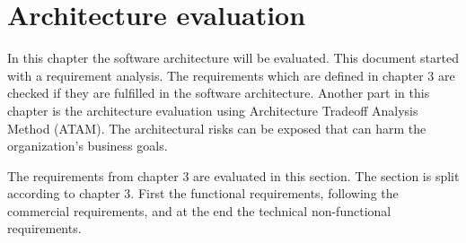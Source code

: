 \chapter{Architecture evaluation}
\label{ch:evaluation}
In this chapter the software architecture will be evaluated. This document started with a requirement analysis. The requirements which are defined in chapter 3 are checked if they are fulfilled in the software architecture. Another part in this chapter is the architecture evaluation using Architecture Tradeoff Analysis Method (ATAM). The architectural risks can be exposed that can harm the organization's business goals.


The requirements from chapter 3 are evaluated in this section. The section is split according to chapter 3. First  the functional requirements, following the commercial requirements, and at the end the technical non-functional requirements.


